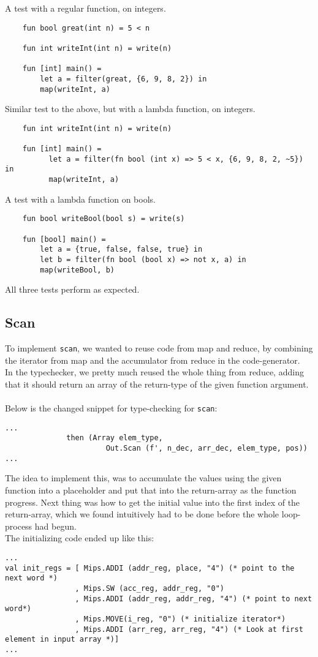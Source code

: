 \documentclass[paper=a4, fontsize=11pt]{scrartcl} %
\numberwithin{equation}{section} %
\numberwithin{figure}{section} %
\numberwithin{table}{section} %
\begin{document}
	A test with a regular function, on integers.
	\begin{lstlisting}
	fun bool great(int n) = 5 < n

	fun int writeInt(int n) = write(n)

	fun [int] main() =
  		let a = filter(great, {6, 9, 8, 2}) in
  		map(writeInt, a)
	\end{lstlisting}

	Similar test to the above, but with a lambda function, on integers.
	\begin{lstlisting}
	fun int writeInt(int n) = write(n)

	fun [int] main() =
		  let a = filter(fn bool (int x) => 5 < x, {6, 9, 8, 2, ~5}) in
		  map(writeInt, a)
	\end{lstlisting}

	A test with a lambda function on bools.
	\begin{lstlisting}
	fun bool writeBool(bool s) = write(s)

	fun [bool] main() =
		let a = {true, false, false, true} in
		let b = filter(fn bool (bool x) => not x, a) in
		map(writeBool, b)
	\end{lstlisting}

	All three tests perform as expected.
\subsection{Scan}
To implement \verb"scan", we wanted to reuse code from map and reduce, by combining the iterator from map and the accumulator from reduce in the code-generator.\\
In the typechecker, we pretty much reused the whole thing from reduce, adding that it should return an array of the return-type of the given function argument.\\\\
Below is the changed snippet for type-checking for \verb"scan":
\begin{lstlisting}
...
              then (Array elem_type,
                       Out.Scan (f', n_dec, arr_dec, elem_type, pos))
...
\end{lstlisting}

The idea to implement this, was to accumulate the values using the given function into a placeholder and put that into the return-array as the function progress. Next thing was how to get the initial value into the first index of the return-array, which we found intuitively had to be done before the whole loop-process had begun.\\
The initializing code ended up like this:
\begin{lstlisting}
...
val init_regs = [ Mips.ADDI (addr_reg, place, "4") (* point to the next word *)
                , Mips.SW (acc_reg, addr_reg, "0")
                , Mips.ADDI (addr_reg, addr_reg, "4") (* point to next word*)
                , Mips.MOVE(i_reg, "0") (* initialize iterator*)
                , Mips.ADDI (arr_reg, arr_reg, "4") (* Look at first element in input array *)]
...
\end{lstlisting}
\end{document}

